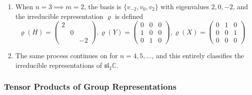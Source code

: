 \begin{enumerate}
    \item When $n=3 \implies m=2$, the basis is $\{v_{-2}, v_0, v_2\}$ with eigenvalues $2, 0, -2$, and the irreducible representation $\varrho$ is defined
      \begin{equation}
        \varrho(H) = \begin{pmatrix}
        2&&\\&0&\\&&-2
        \end{pmatrix}, \varrho(Y) = \begin{pmatrix}
        0&0&0\\1&0&0\\0&1&0
        \end{pmatrix}, \varrho(X) = \begin{pmatrix}
        0&1&0\\0&0&1\\0&0&0
        \end{pmatrix}
      \end{equation}

    \item The same process continues on for $n=4, 5, ...$, and this entirely classifies the irreducible representations of $\mathfrak{sl}_2 \mathbb{C}$. 
  \end{enumerate} 

  \pagebreak

  \subsubsection{Tensor Products of Group Representations}

